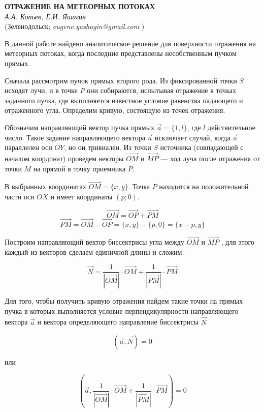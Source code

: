 \begin{center}{ \bf ОТРАЖЕНИЕ НА МЕТЕОРНЫХ ПОТОКАХ}\\
{\it А.А. Копьев, Е.И. Яшагин} \\
(Зеленодольск; {\it eugene.yashagin@gmail.com} )
\end{center}


В данной работе найдено аналитическое решение для поверхности отражения на метеорных потоках, когда последние представлены несобственным пучком прямых.

Сначала рассмотрим пучок прямых второго рода. Из фиксированной точки $S$ исходят лучи, и в точке $P$ они собираются, испытывая отражение в точках заданного пучка, где выполняется известное условие равенства падающего и отраженного угла. Определим кривую, состоящую из точек отражения.

Обозначим направляющий вектор пучка прямых $\vec a = \{ 1,l \}$, где $l$ действительное число. Такое задание направляющего вектора $\vec a $ исключает случай, когда $\vec a $ параллелен оси $ OY$, но он тривиален. Из точки $S$ источника (совпадающей с началом координат) проведем векторы $\overrightarrow{OM}$ и $\overrightarrow{MP}$ --- ход луча после отражения от точки $M$ на прямой в точку приемника $P$.

В выбранных координатах $\overrightarrow{OM}=\{x,y\}$. Точка $P$ находится на положительной части оси $OX$ и имеет координаты $(p;0)$.


$$\overrightarrow{OM}=\overrightarrow{OP}+\overrightarrow{PM}$$
$$\overrightarrow{PM}=\overrightarrow{OM}-\overrightarrow{OP}=\{x,y\}-\{p,0\}=\{x-p,y\}$$

Построим направляющий вектор биссектрисы   угла между $\overrightarrow{OM}$ и $\overrightarrow{MP}$ , для этого каждый из векторов сделаем единичной длины и сложим.


$$ \vec{N}=\frac{1}{|\overrightarrow{OM}|}\cdot\overrightarrow{OM}+\frac{1}{|\overrightarrow{PM}|}\cdot\overrightarrow{PM} $$



Для того, чтобы получить кривую отражения найдем такие точки на прямых пучка в которых выполняется условие перпендикулярности направляющего вектора $\vec a$ и  вектора определяющего направление биссектрисы $\vec N$

$$(\vec a,\vec N )=0$$

или

$$\left(\vec a,\frac{1}{|\overrightarrow{OM}|}\cdot\overrightarrow{OM}+\frac{1}{|\overrightarrow{PM}|}\cdot\overrightarrow{PM}\right) =0$$



